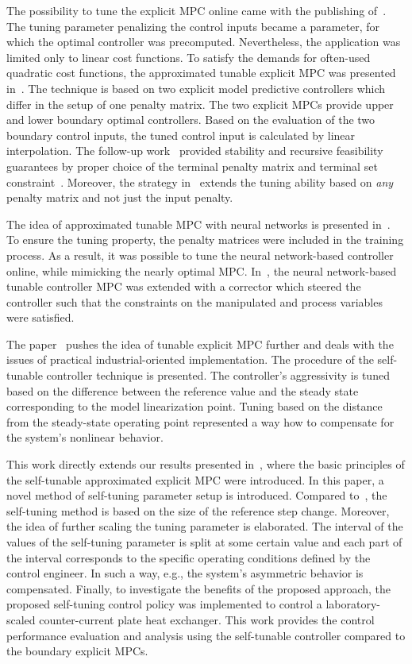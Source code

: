 \documentclass[preprint,12pt]{elsarticle}
\begin{document}
	The possibility to tune the explicit MPC online came with the publishing of~\cite{Baric_tunable}. The tuning parameter penalizing the control inputs became a parameter, for which the optimal controller was precomputed. Nevertheless, the application was limited only to linear cost functions. To satisfy the demands for often-used quadratic cost functions, the approximated tunable explicit MPC was presented in~\cite{Klauco_tunable}. The technique is based on two explicit model predictive controllers which differ in the setup of one penalty matrix. The two explicit MPCs provide upper and lower boundary optimal controllers. Based on the evaluation of the two boundary control inputs, the tuned control input is calculated by linear interpolation. The follow-up work~\cite{Oravec_tunable} provided stability and recursive feasibility guarantees by proper choice of the terminal penalty matrix and terminal set constraint~\cite{Mayne_stability}. Moreover, the strategy in~\cite{Oravec_tunable} extends the tuning ability based on \textit{any} penalty matrix and not just the input penalty.
	
	The idea of approximated tunable MPC with neural networks is presented in~\cite{Kis_NN_MPC}. To ensure the tuning property, the penalty matrices were included in the training process. As a result, it was possible to tune the neural network-based controller online, while mimicking the nearly optimal MPC. In~\cite{Kis_NN_MPC_corrector}, the neural network-based tunable controller MPC was extended with a corrector which steered the controller such that the constraints on the manipulated and process variables were satisfied. 
	
	The paper~\cite{self_tunable} pushes the idea of tunable explicit MPC further and deals with the issues of practical industrial-oriented implementation. The procedure of the self-tunable controller technique is presented. The controller's aggressivity is tuned based on the difference between the reference value and the steady state corresponding to the model linearization point. Tuning based on the distance from the steady-state operating point represented a way how to compensate for the system's nonlinear behavior.
	
	This work directly extends our results presented in~\cite{self_tunable}, where the basic principles of the self-tunable approximated explicit MPC were introduced. In this paper, a novel method of self-tuning parameter setup is introduced. Compared to~\cite{self_tunable}, the self-tuning method is based on the size of the reference step change. Moreover, the idea of further scaling the tuning parameter is elaborated. The interval of the values of the self-tuning parameter is split at some certain value and each part of the interval corresponds to the specific operating conditions defined by the control engineer. In such a way, e.g., the system's asymmetric behavior is compensated. Finally, to investigate the benefits of the proposed approach, the proposed self-tuning control policy was implemented to control a laboratory-scaled counter-current plate heat exchanger. This work provides the control performance evaluation and analysis using the self-tunable controller compared to the boundary explicit MPCs.
	
\end{document}
